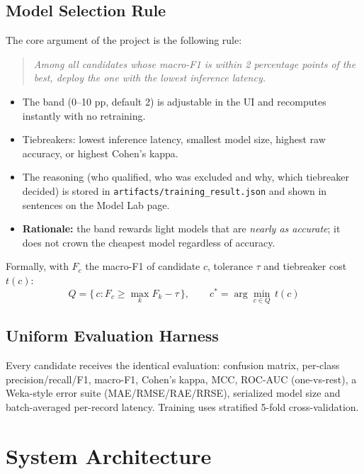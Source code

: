 \documentclass[12pt,a4paper]{article}
\begin{document}
\subsection{Model Selection Rule}
The core argument of the project is the following rule:
\begin{quote}
\itshape Among all candidates whose macro-F1 is within 2 percentage points of the
best, deploy the one with the lowest inference latency.
\end{quote}
\begin{itemize}
  \item The band (0--10 pp, default 2) is adjustable in the UI and recomputes
        instantly with no retraining.
  \item Tiebreakers: lowest inference latency, smallest model size, highest raw
        accuracy, or highest Cohen's kappa.
  \item The reasoning (who qualified, who was excluded and why, which tiebreaker
        decided) is stored in \texttt{artifacts/training\_result.json} and shown in
        sentences on the Model Lab page.
  \item \textbf{Rationale:} the band rewards light models that are \textit{nearly as
        accurate}; it does not crown the cheapest model regardless of accuracy.
\end{itemize}

Formally, with $F_c$ the macro-F1 of candidate $c$, tolerance $\tau$ and tiebreaker
cost $t(c)$:
\begin{equation}
  Q = \{\,c : F_c \ge \max_k F_k - \tau\,\}, \qquad
  c^{*} = \arg\min_{c\in Q}\, t(c)
\end{equation}

\subsection{Uniform Evaluation Harness}
Every candidate receives the identical evaluation: confusion matrix, per-class
precision/recall/F1, macro-F1, Cohen's kappa, MCC, ROC-AUC (one-vs-rest), a
Weka-style error suite (MAE/RMSE/RAE/RRSE), serialized model size and batch-averaged
per-record latency. Training uses stratified 5-fold cross-validation.

\clearpage
\section{System Architecture}
\end{document}
